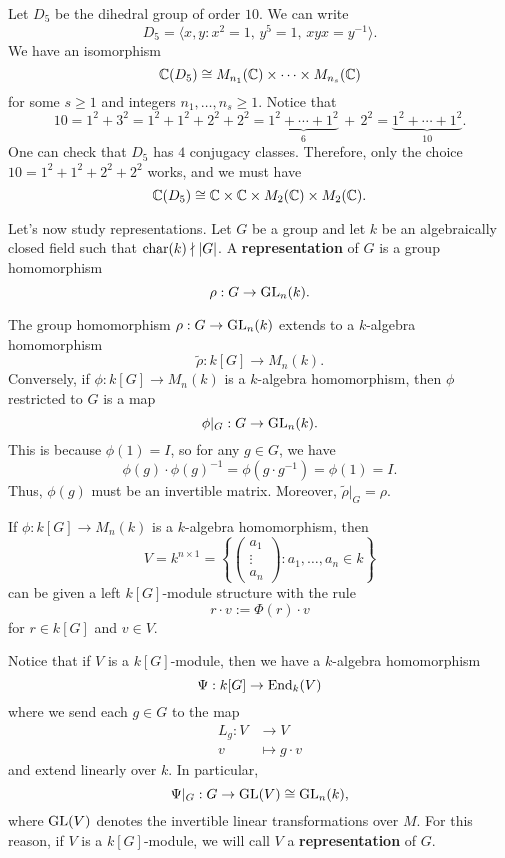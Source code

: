 \begin{exmp}{}
    Let $D_5$ be the dihedral group of order $10$. We can write 
    \[ D_5 = \langle x, y : x^2 = 1,\, y^5 = 1,\, xyx = y^{-1} \rangle. \] 
    We have an isomorphism 
    \[ \mathbb{C}(D_5) \cong M_{n_1}(\mathbb{C}) \times \cdots \times M_{n_s}(\mathbb{C}) \] 
    for some $s \geq 1$ and integers $n_1, \dots, n_s \geq 1$. 
    Notice that 
    \[ 10 = 1^2 + 3^2 = 1^2 + 1^2 + 2^2 + 2^2 = \underbrace{1^2 + \cdots + 1^2}_{6} \,+\, 2^2 
    = \underbrace{1^2 + \cdots + 1^2}_{10}. \] 
    One can check that $D_5$ has $4$ conjugacy classes. Therefore, only the 
    choice $10 = 1^2 + 1^2 + 2^2 + 2^2$ works, and we must have 
    \[ \mathbb{C}(D_5) \cong \mathbb{C} \times \mathbb{C} \times M_2(\mathbb{C}) \times M_2(\mathbb{C}). \] 
\end{exmp}

Let's now study representations. Let $G$ be a group and 
let $k$ be an algebraically closed field such that $\operatorname{char}(k) \nmid |G|$. 
A {\bf representation} of $G$ is a group homomorphism 
\[ \rho : G \to \operatorname{GL}_n(k). \]

\begin{remark}{}
    The group homomorphism $\rho : G \to \operatorname{GL}_n(k)$ extends to a $k$-algebra 
    homomorphism 
    \[ \tilde\rho : k[G] \to M_n(k). \] 
    Conversely, if $\phi : k[G] \to M_n(k)$ is a $k$-algebra homomorphism, then
    $\phi$ restricted to $G$ is a map  
    \[ \phi|_G : G \to \operatorname{GL}_n(k). \] 
    This is because $\phi(1) = I$, so for any $g \in G$, we have 
    \[ \phi(g) \cdot \phi(g)^{-1} = \phi(g \cdot g^{-1}) = \phi(1) = I. \] 
    Thus, $\phi(g)$ must be an invertible matrix. Moreover, $\tilde\rho|_G 
    = \rho$. 
\end{remark}

\begin{remark}{}
    If $\phi : k[G] \to M_n(k)$ is a $k$-algebra homomorphism, then 
    \[ V = k^{n\times 1} = \left\{ \begin{pmatrix} a_1 \\ \vdots \\ a_n
    \end{pmatrix} : a_1, \dots, a_n \in k \right\} \] 
    can be given a left $k[G]$-module structure with the rule 
    \[ r \cdot v := \Phi(r) \cdot v \] 
    for $r \in k[G]$ and $v \in V$. 
\end{remark} 

Notice that if $V$ is a $k[G]$-module, then we have a $k$-algebra homomorphism
\[ \Psi : k[G] \to \operatorname{End}_k(V) \] 
where we send each $g \in G$ to the map 
\begin{align*} L_g : V &\to V \\ v &\mapsto g\cdot v \end{align*}
and extend linearly over $k$. In particular, 
\[ \Psi|_G : G \to \operatorname{GL}(V) \cong \operatorname{GL}_n(k), \] 
where $\operatorname{GL}(V)$ denotes the invertible linear transformations over $M$. 
For this reason, if $V$ is a $k[G]$-module, we will call $V$ a 
{\bf representation} of $G$. 


